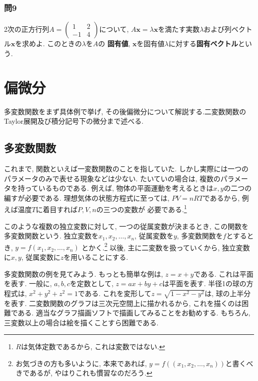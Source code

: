 \documentclass[a4j,dvipdfmx]{jsarticle}
\numberwithin{equation}{section}
\begin{document}
        \subsubsection*{問9} 2次の正方行列$A=\begin{pmatrix}1 & 2\\-1 & 4\end{pmatrix}$について, $A\bm{x}=\lambda\bm{x}$を満たす実数$\lambda$および列ベクトル$\bm{x}$を求めよ. このときの$\lambda$を$A$の
        \textbf{固有値}, $\bm{x}$を固有値$\lambda$に対する\textbf{固有ベクトル}という. 
    \clearpage
    \section{偏微分}
        多変数関数をまず具体例で挙げ, その後偏微分について解説する.二変数関数のTaylor展開及び積分記号下の微分まで述べる.
        \subsection{多変数関数}
            これまで, 関数といえば一変数関数のことを指していた. しかし実際には一つのパラメータのみで表せる現象などは少ない. たいていの場合は, 複数のパラメータを持っているものである.
            例えば, 物体の平面運動を考えるときは$x,y$の二つの編すが必要である. 理想気体の状態方程式に至っては, $PV=nRT$であるから, 例えば温度$T$に着目すれば$P,V,n$の三つの変数が
            必要である.\footnote{$R$は気体定数であるから, これは変数ではない.}

            このような複数の独立変数に対して, 一つの従属変数が決まるとき, この関数を多変数関数という. 独立変数を$x_1,x_2,\dots,x_n$, 従属変数を$y$, 多変数関数を$f$とするとき, $y=f(x_1,x_2,\dots,x_n)$
            とかく.\footnote{お気づきの方も多いように, 本来であれば, $y=f((x_1,x_2,\dots,x_n))$と書くべきであるが, やはりこれも慣習なのだろう.}
            以後, 主に二変数を扱っていくから, 独立変数に$x,y$, 従属変数に$z$を用いることにする.

            多変数関数の例を見てみよう. もっとも簡単な例は, $z=x+y$である. これは平面を表す. 一般に, $a,b,c$を定数として, $z=ax+by+c$は平面を表す.
            半径1の球の方程式は, $x^2+y^2+z^2=1$である. これを変形して$z=\sqrt{1-x^2-y^2}$は, 球の上半分を表す.
            二変数関数のグラフは三次元空間上に描かれるから, これを描くのは困難である. 適当なグラフ描画ソフトで描画してみることをお勧めする. もちろん, 三変数以上の場合は絵を描くことすら困難である.
\end{document}
